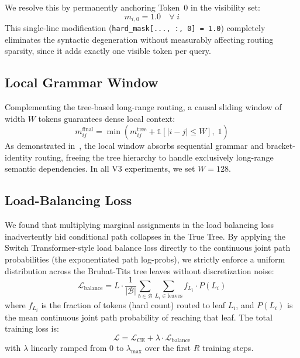 \documentclass[11pt,a4paper]{article}
\begin{document}
We resolve this by permanently anchoring Token~0 in the visibility set:
\begin{equation}
    m_{i,0} = 1.0 \quad \forall\; i
\end{equation}
This single-line modification (\texttt{hard\_mask[..., :, 0] = 1.0}) completely eliminates the syntactic degeneration without measurably affecting routing sparsity, since it adds exactly one visible token per query.

\subsection{Local Grammar Window}

Complementing the tree-based long-range routing, a causal sliding window of width $W$ tokens guarantees dense local context:
\begin{equation}
    m_{ij}^{\text{final}} = \min\!\left(m_{ij}^{\text{tree}} + \mathbb{1}\!\left[|i - j| \leq W\right],\; 1\right)
\end{equation}
As demonstrated in~\citet{learningtoskip2026}, the local window absorbs sequential grammar and bracket-identity routing, freeing the tree hierarchy to handle exclusively long-range semantic dependencies. In all V3 experiments, we set $W = 128$.

\subsection{Load-Balancing Loss}
\label{sec:load_balance}

We found that multiplying marginal assignments in the load balancing loss inadvertently hid conditional path collapses in the True Tree. By applying the Switch Transformer-style load balance loss directly to the continuous joint path probabilities (the exponentiated path log-probs), we strictly enforce a uniform distribution across the Bruhat-Tits tree leaves without discretization noise:
\begin{equation}
    \mathcal{L}_{\text{balance}} = L \cdot \frac{1}{|\mathcal{B}|} \sum_{b \in \mathcal{B}} \sum_{L_i \in \text{leaves}} f_{L_i} \cdot P(L_i)
\end{equation}
where $f_{L_i}$ is the fraction of tokens (hard count) routed to leaf $L_i$, and $P(L_i)$ is the mean continuous joint path probability of reaching that leaf. The total training loss is:
\begin{equation}
    \mathcal{L} = \mathcal{L}_{\text{CE}} + \lambda \cdot \mathcal{L}_{\text{balance}}
\end{equation}
with $\lambda$ linearly ramped from $0$ to $\lambda_{\max}$ over the first $R$ training steps.
\end{document}
